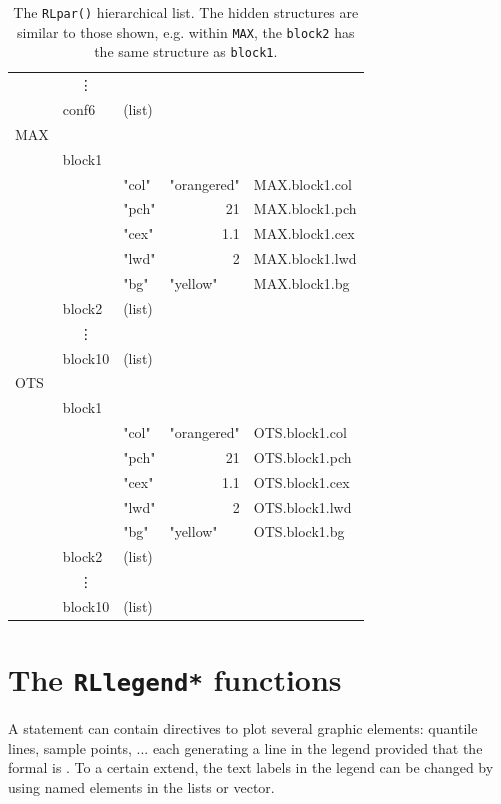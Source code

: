 \documentclass[a4paper]{report}
\begin{document}
\begin{table}
\begin{tabular}{|l|l|l|l|l|}
     &  \multicolumn{1}{c|}{\vdots} &   &  & \\ 
     &  conf6 & (list)   &  &\\ 
\hline
MAX &  & & & \\ 
     &  block1 &    & & \\ 
     &  & "col" & "orangered" & MAX.block1.col \\ 
     &  & "pch"& \multicolumn{1}{r|}{21} & MAX.block1.pch \\ 
     &  & "cex"& \multicolumn{1}{r|}{1.1} & MAX.block1.cex \\ 
     &  & "lwd"& \multicolumn{1}{r|}{2} & MAX.block1.lwd \\ 
     &  & "bg" & "yellow" & MAX.block1.bg \\ 
     &  block2 & (list)   &  &\\ 
     &  \multicolumn{1}{c|}{\vdots} &   &  & \\ 
     &  block10 & (list)   &  &\\ 
\hline
OTS &  & & & \\ 
     &  block1 &    & & \\ 
     &  & "col" & "orangered" & OTS.block1.col \\ 
     &  & "pch"& \multicolumn{1}{r|}{21} & OTS.block1.pch \\ 
     &  & "cex"& \multicolumn{1}{r|}{1.1} & OTS.block1.cex \\ 
     &  & "lwd"& \multicolumn{1}{r|}{2} & OTS.block1.lwd \\ 
     &  & "bg" & "yellow" & OTS.block1.bg \\ 
     &  block2 & (list)   &  &\\ 
     &  \multicolumn{1}{c|}{\vdots} &   &  & \\ 
     &  block10 & (list)   &  &\\ 
\hline   \end{tabular}\caption{\label{RLparTable} \rm The \texttt{RLpar()} hierarchical list. The hidden
  structures are similar to those shown, e.g. within \texttt{MAX}, the \texttt{block2} has the same structure
  as \texttt{block1}.} \end{table}


\section{The \texttt{RLlegend*} functions} 
\label{secRLlegend}
A \verb@plot@ statement can contain directives to plot several
graphic elements: quantile lines, sample points, ... each generating a line in
the legend provided that the \verb@legend@ formal is \verb@TRUE@. To a certain
extend, the text labels in the legend can be changed by using named elements in
the lists or vector.
\end{document}
